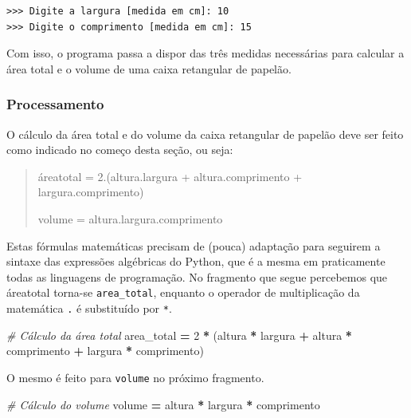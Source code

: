 \documentclass[
]{book}
\newenvironment{Shaded}{\begin{snugshade}}{\end{snugshade}}
\newcommand{\CommentTok}[1]{\textcolor[rgb]{0.56,0.35,0.01}{\textit{#1}}}
\newcommand{\DecValTok}[1]{\textcolor[rgb]{0.00,0.00,0.81}{#1}}
\newcommand{\NormalTok}[1]{#1}
\newcommand{\OperatorTok}[1]{\textcolor[rgb]{0.81,0.36,0.00}{\textbf{#1}}}
\begin{document}
\begin{verbatim}
>>> Digite a largura [medida em cm]: 10
>>> Digite o comprimento [medida em cm]: 15
\end{verbatim}

Com isso, o programa passa a dispor das três medidas necessárias para calcular a área total e o volume de uma caixa retangular de papelão.

\hypertarget{processamento-1}{%
\subsubsection{Processamento}\label{processamento-1}}

O cálculo da área total e do volume da caixa retangular de papelão deve ser feito como indicado no começo desta seção, ou seja:

\begin{quote}
áreatotal = 2.(altura.largura + altura.comprimento + largura.comprimento)

volume = altura.largura.comprimento
\end{quote}

Estas fórmulas matemáticas precisam de (pouca) adaptação para seguirem a sintaxe das expressões algébricas do Python, que é a mesma em praticamente todas as linguagens de programação. No fragmento que segue percebemos que áreatotal torna-se \texttt{area\_total}, enquanto o operador de multiplicação da matemática \texttt{.} é substituído por \texttt{*}.

\begin{Shaded}
\begin{Highlighting}[]
\CommentTok{\# Cálculo da área total}
\NormalTok{area\_total }\OperatorTok{=} \DecValTok{2} \OperatorTok{*}\NormalTok{ (altura }\OperatorTok{*}\NormalTok{ largura }\OperatorTok{+}\NormalTok{ altura }\OperatorTok{*}\NormalTok{ comprimento }
    \OperatorTok{+}\NormalTok{ largura }\OperatorTok{*}\NormalTok{ comprimento)}
\end{Highlighting}
\end{Shaded}

O mesmo é feito para \texttt{volume} no próximo fragmento.

\begin{Shaded}
\begin{Highlighting}[]
\CommentTok{\# Cálculo do volume}
\NormalTok{volume }\OperatorTok{=}\NormalTok{ altura }\OperatorTok{*}\NormalTok{ largura }\OperatorTok{*}\NormalTok{ comprimento}
\end{Highlighting}
\end{Shaded}
\end{document}
